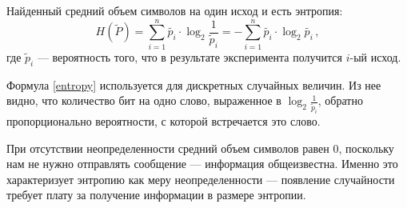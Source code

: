 Найденный средний объем символов на один исход и есть энтропия:
\begin{equation}
	H(\tilde P) = \sum_{i=1}^{n}\tilde{p_i} \cdot \log_2 {\frac{1}{\tilde p_i}} =- \sum_{i=1}^{n}\tilde{p_i} \cdot \log_2 \tilde{p_i} \, ,
	\label{entropy}
\end{equation}
где $\tilde p_i$ --- вероятность того, что в результате эксперимента получится $i$-ый исход.

Формула \eqref{entropy} используется для дискретных случайных величин. Из нее видно, что количество бит на одно слово, выраженное в $\displaystyle\log_2 {\frac{1}{\tilde p_i}}$, обратно пропорционально вероятности, с которой встречается это слово.

При отсутствии неопределенности средний объем символов равен 0, поскольку нам не нужно отправлять сообщение --- информация общеизвестна. Именно это характеризует энтропию как меру неопределенности --- появление случайности требует плату за получение информации в размере энтропии.